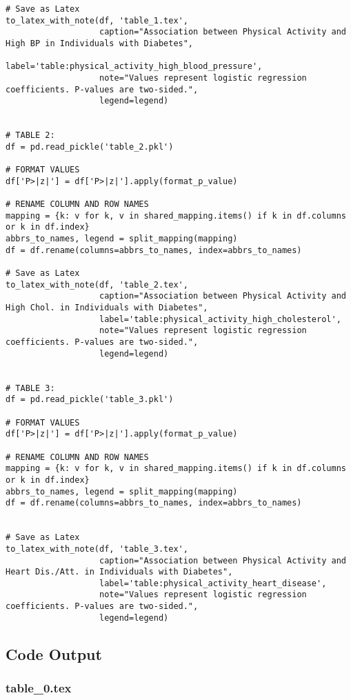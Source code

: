 \documentclass[11pt]{article}
\begin{document}
\begin{verbatim}
# Save as Latex
to_latex_with_note(df, 'table_1.tex',
                   caption="Association between Physical Activity and High BP in Individuals with Diabetes", 
                   label='table:physical_activity_high_blood_pressure',
                   note="Values represent logistic regression coefficients. P-values are two-sided.",
                   legend=legend)


# TABLE 2:
df = pd.read_pickle('table_2.pkl')

# FORMAT VALUES 
df['P>|z|'] = df['P>|z|'].apply(format_p_value)

# RENAME COLUMN AND ROW NAMES
mapping = {k: v for k, v in shared_mapping.items() if k in df.columns or k in df.index}
abbrs_to_names, legend = split_mapping(mapping)
df = df.rename(columns=abbrs_to_names, index=abbrs_to_names)

# Save as Latex
to_latex_with_note(df, 'table_2.tex',
                   caption="Association between Physical Activity and High Chol. in Individuals with Diabetes",
                   label='table:physical_activity_high_cholesterol',
                   note="Values represent logistic regression coefficients. P-values are two-sided.",
                   legend=legend)


# TABLE 3:
df = pd.read_pickle('table_3.pkl')

# FORMAT VALUES 
df['P>|z|'] = df['P>|z|'].apply(format_p_value)

# RENAME COLUMN AND ROW NAMES
mapping = {k: v for k, v in shared_mapping.items() if k in df.columns or k in df.index}
abbrs_to_names, legend = split_mapping(mapping)
df = df.rename(columns=abbrs_to_names, index=abbrs_to_names)


# Save as Latex
to_latex_with_note(df, 'table_3.tex',
                   caption="Association between Physical Activity and Heart Dis./Att. in Individuals with Diabetes",
                   label='table:physical_activity_heart_disease',
                   note="Values represent logistic regression coefficients. P-values are two-sided.",
                   legend=legend)

\end{verbatim}



\subsection{Code Output}

\subsubsection*{table\_0.tex}
\end{document}
